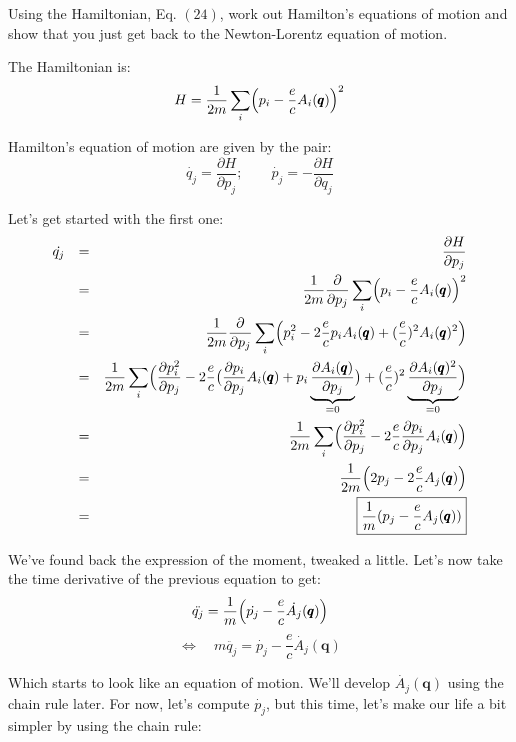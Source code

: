 \documentclass[solutions.tex]{subfiles}
\begin{document}
\maketitle
\begin{exercise}
Using the Hamiltonian, Eq. $(24)$, work out Hamilton's equations of motion
and show that you just get back to the Newton-Lorentz equation of motion.
\end{exercise}

The Hamiltonian is:
\[
	H = \frac{1}{2m}\sum_i\Bigl(p_i - \frac{e}cA_i(\pmb{q})\Bigr)^2
\]

Hamilton's equation of motion are given by the pair:
\[
	\dot{q_j} = \frac{\partial H}{\partial p_j};\qquad
	\dot{p_j} = -\frac{\partial H}{\partial q_j}
\]

Let's get started with the first one:
\begin{equation*}\begin{aligned}
	\dot{q_j} &&=&& \frac{\partial H}{\partial p_j} \\
	~ &&=&& \frac{1}{2m}\frac{\partial}{\partial p_j}
		\sum_i\Bigl(p_i - \frac{e}cA_i(\pmb{q})\Bigr)^2 \\
	~ &&=&& \frac{1}{2m}\frac{\partial}{\partial p_j}
		\sum_i\Bigl(p_i^2 - 2\frac{e}cp_iA_i(\pmb{q}) + (\frac{e}c)^2A_i(\pmb{q})^2\Bigr) \\
	~ &&=&&\frac{1}{2m} \sum_i\Bigl(
		\frac{\partial p_i^2}{\partial p_j}
		-2\frac{e}c\bigl(
			\frac{\partial p_i}{\partial p_j}A_i(\pmb{q})
			+p_i\underbrace{\frac{\partial A_i(\pmb{q})}{\partial p_j}}_{=0}
		\bigr)
		+(\frac{e}c)^2\underbrace{\frac{\partial A_i(\pmb{q})^2}{\partial p_j}}_{=0}
	\Bigr) \\
	~ &&=&&\frac{1}{2m} \sum_i\Bigl(
		\frac{\partial p_i^2}{\partial p_j}
		-2\frac{e}c\frac{\partial p_i}{\partial p_j}A_i(\pmb{q})
		\Bigr) \\
	~ &&=&&\frac{1}{2m} \Bigl(
		2p_j -2\frac{e}cA_j(\pmb{q})
		\Bigr) \\
	~ &&=&& \boxed{\frac1m(p_j - \frac{e}cA_j(\pmb{q}))}
\end{aligned}\end{equation*}

We've found back the expression of the moment, tweaked a little.
Let's now take the time derivative of the previous equation to get:
\[
	\ddot{q_j} = \frac1m\Bigl(\dot{p_j} -\frac{e}c\dot{A_j}(\pmb{q})\Bigr)
\]
\[
	\Leftrightarrow\quad m\ddot{q_j} = \dot{p_j} -\frac{e}c\dot{A_j}(\bm{q})
\]

Which starts to look like an equation of motion. We'll develop
$\dot{A_j}(\bm{q})$ using the chain rule later. For now, let's
compute $\dot{p_j}$, but this time, let's make our life a bit
simpler by using the chain rule:
\end{document}
